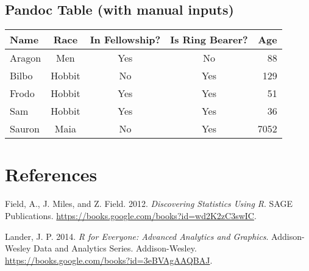 \documentclass[
]{article}
\begin{document}
\hypertarget{pandoc-table-with-manual-inputs}{%
\subsection{Pandoc Table (with manual
inputs)}\label{pandoc-table-with-manual-inputs}}

\begin{longtable}[]{@{}lcccr@{}}
\toprule
Name & Race & In Fellowship? & Is Ring Bearer? & Age\tabularnewline
\midrule
\endhead
Aragon & Men & Yes & No & 88\tabularnewline
Bilbo & Hobbit & No & Yes & 129\tabularnewline
Frodo & Hobbit & Yes & Yes & 51\tabularnewline
Sam & Hobbit & Yes & Yes & 36\tabularnewline
Sauron & Maia & No & Yes & 7052\tabularnewline
\bottomrule
\end{longtable}

\hypertarget{references}{%
\section*{References}\label{references}}

\hypertarget{refs}{}
\leavevmode\hypertarget{ref-field2012discovering}{}%
Field, A., J. Miles, and Z. Field. 2012. \emph{Discovering Statistics
Using R}. SAGE Publications.
\url{https://books.google.com/books?id=wd2K2zC3swIC}.

\leavevmode\hypertarget{ref-lander2014r}{}%
Lander, J. P. 2014. \emph{R for Everyone: Advanced Analytics and
Graphics}. Addison-Wesley Data and Analytics Series. Addison-Wesley.
\url{https://books.google.com/books?id=3eBVAgAAQBAJ}.
\end{document}
